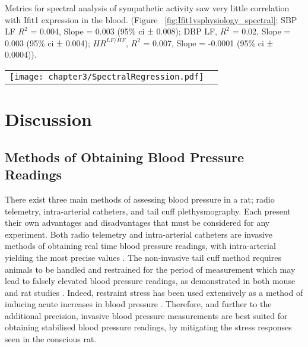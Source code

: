 Metrics for spectral analysis of sympathetic activity saw very little correlation with Ifit1 expression in the blood. (Figure ~\ref{fig:Ifit1vsphysiology_spectral}; SBP LF $R^{2}$ = 0.004, Slope = 0.003 (95\% \acrshort{ci} ± 0.008); DBP LF, $R^{2}$ = 0.02, Slope = 0.003 (95\% \acrshort{ci} ± 0.004); $HR^{LF/HF}$, $R^{2}$ = 0.007, Slope = -0.0001 (95\% \acrshort{ci} ± 0.0004)). \\

\begin{figure*}[!htbp]
\centering
\begin{tabular}{cc}
  \texttt{[image: chapter3/SpectralRegression.pdf]} \\
\end{tabular}
\caption[Linear Regression Analysis of Spectral Analysis Data against Ifit1 blood expression]{Linear Regression Analysis of Spectral Analysis Data, against Oaz1 normalised Ifit1 blood expression $2^{-\Delta\Delta C_{T}}$ values. Here, Systolic blood pressure (SBP) and Diastolic blood pressure (DBP) Low Frequency spectra are used (LF; 0.27-0.74Hz, $mmHg^{2}$). Also displayed is the linear regression for heart rate (HR) ratio of LF to High Frequency (HF; 0.75 - 5Hz, $HR^{LF/HF}$). For the regression model, displayed here are the slope coefficient of the regression line and the $R^{2}$ correlation coefficient. Also highlighted in grey is the 95\% \acrfull{ci} range for the model. Note the rescaled x-axis for the \acrshort{wky} plot.}
\label{fig:Ifit1vsphysiology_spectral}
\end{figure*}

\section{Discussion}

\subsection{Methods of Obtaining Blood Pressure Readings}
There exist three main methods of assessing blood pressure in a rat; radio telemetry, intra-arterial catheters, and tail cuff plethysmography. Each present their own advantages and disadvantages that must be considered for any experiment. Both radio telemetry and intra-arterial catheters are invasive methods of obtaining real time blood pressure readings, with intra-arterial yielding the most precise values \cite{Plehm2006}. The non-invasive tail cuff method requires animals to be handled and restrained for the period of measurement which may lead to falsely elevated blood pressure readings, as demonstrated in both mouse and rat studies \cite{Wilde2017,Irvine1997}. Indeed, restraint stress has been used extensively as a method of inducing acute increases in blood pressure \cite{Sarenac2011}. Therefore, and further to the additional precision, invasive blood pressure measurements are best suited for obtaining stabilised blood pressure readings, by mitigating the stress responses seen in the conscious rat. 

